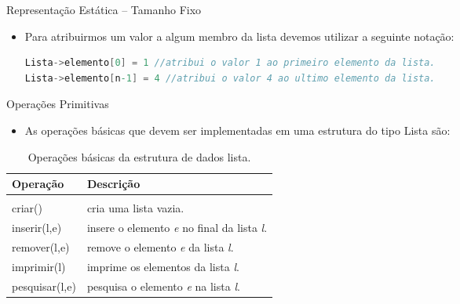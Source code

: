 \begin{frame}[fragile,c]{Representação Estática -- Tamanho Fixo}
\begin{itemize}
	
 \item Para atribuirmos um valor a algum membro da lista devemos utilizar a seguinte notação:

\small	
\begin{lstlisting}[language=C]
Lista->elemento[0] = 1 //atribui o valor 1 ao primeiro elemento da lista.
Lista->elemento[n-1] = 4 //atribui o valor 4 ao ultimo elemento da lista.
\end{lstlisting}
\end{itemize}
\end{frame}  

\begin{frame}{Operações Primitivas}
  \begin{itemize}
	  \item As operações básicas que devem ser implementadas em uma estrutura do tipo Lista são:		
  \end{itemize}
  \begin{table}[!htpb]
	\centering
    \begin{tabular}{l|l}
	 \hline \hline 
	 \textbf{Operação} & \textbf{Descrição} \\
	\hline \hline \\
	criar() & cria uma lista vazia.\\
	 \hline inserir(l,e) & insere o elemento \textit{e} no final da lista \textit{l}.\\
	 \hline remover(l,e) & remove o elemento \textit{e} da lista \textit{l}.\\
	\hline imprimir(l) & imprime os elementos da lista \textit{l}.\\
	\hline pesquisar(l,e) & pesquisa o elemento \textit{e} na lista \textit{l}.\\
	\hline 	\hline 
	\end{tabular}
	\caption{Operações básicas da estrutura de dados lista.}
\end{table}
\end{frame}
 
